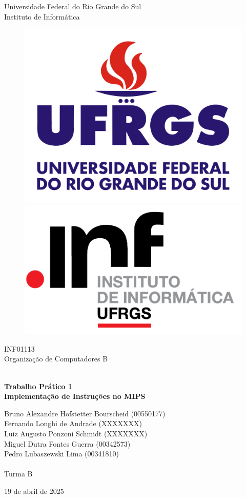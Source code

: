 \documentclass{report}
\begin{document}
    \begin{titlepage}
        \centering
        
        \LARGE {Universidade Federal do Rio Grande do Sul \\ Instituto de Informática}
    
        \begin{figure}[h!]
            \centering
            \subfigure
            {\includegraphics[width=0.35\linewidth]{images/logos/UFRGS.png}}
            \hspace{1cm}
            \subfigure
            {\includegraphics[width=0.35\linewidth]{images/logos/INF.png}}
        \end{figure}
    
        \LARGE {INF01113 \\ Organização de Computadores B}
        
        \vfill
        {\noindent\hrulefill \\
        \bfseries \Huge{Trabalho Prático 1} \\ \LARGE{Implementação de Instruções no MIPS} \\
        \noindent\hrulefill}
        
        \vfill
        {\LARGE Bruno Alexandre Hofstetter Bourscheid (00550177) \\ Fernando Longhi de Andrade (XXXXXXX) \\ Luiz Augusto Ponzoni Schmidt (XXXXXXX) \\ Miguel Dutra Fontes Guerra (00342573) \\ Pedro Lubaszewski Lima (00341810) \\~\\ Turma B}
    
        \vfill
        {\LARGE 19 de abril de 2025}
        
    \end{titlepage}
\end{document}
